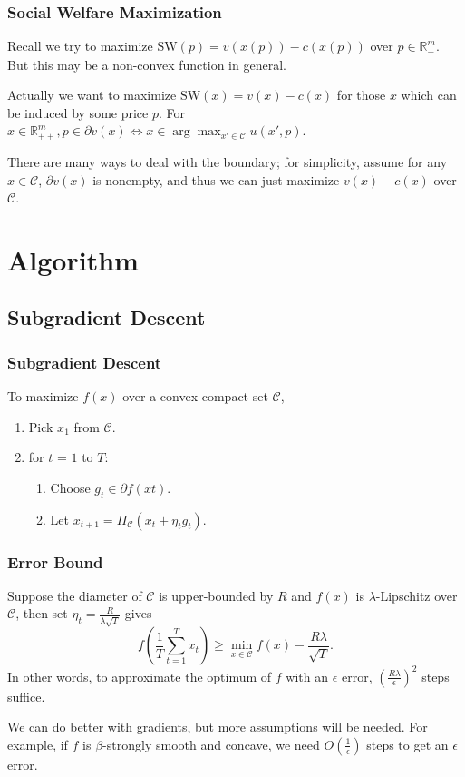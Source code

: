 \documentclass{beamer}
\begin{document}
\begin{frame}
    \frametitle{Social Welfare Maximization}
    Recall we try to maximize $\mathrm{SW}(p)=v(x(p))-c(x(p))$ over $p\in\mathbb{R}_+^m$. But this may be a non-convex function in general.

    Actually we want to maximize $\mathrm{SW}(x)=v(x)-c(x)$ for those $x$ which can be induced by some price $p$. For $x\in \mathbb{R}_{++}^m,p\in\partial v(x)\iff x\in\arg\max_{x'\in \mathcal{C}} u(x',p)$.

    There are many ways to deal with the boundary; for simplicity, assume for any $x\in \mathcal{C}$, $\partial v(x)$ is nonempty, and thus we can just maximize $v(x)-c(x)$ over $\mathcal{C}$.
\end{frame}

\section{Algorithm}
\subsection{Subgradient Descent}

\begin{frame}
    \frametitle{Subgradient Descent}
    To maximize $f(x)$ over a convex compact set $\mathcal{C}$,
    \begin{enumerate}
        \item Pick $x_1$ from $\mathcal{C}$.
        \item for $t$ = $1$ to $T$:
        \begin{enumerate}
            \item Choose $g_t\in\partial f(xt)$.
            \item Let $x_{t+1}=\Pi_{\mathcal{C}}(x_t+\eta_tg_t)$.
        \end{enumerate}
    \end{enumerate}
\end{frame}

\begin{frame}
    \frametitle{Error Bound}
    Suppose the diameter of $\mathcal{C}$ is upper-bounded by $R$ and $f(x)$ is $\lambda$-Lipschitz over $\mathcal{C}$, then set $\eta_t=\frac{R}{\lambda\sqrt{T}}$ gives
    \begin{equation}
        f(\frac{1}{T}\sum_{t=1}^Tx_t)\ge\min_{x\in \mathcal{C}}f(x)-\frac{R\lambda}{\sqrt{T}}.
    \end{equation}
    In other words, to approximate the optimum of $f$ with an $\epsilon$ error, $(\frac{R\lambda}{\epsilon})^2$ steps suffice.

    We can do better with gradients, but more assumptions will be needed. For example, if $f$ is $\beta$-strongly smooth and concave, we need $O(\frac{1}{\epsilon})$ steps to get an $\epsilon$ error.
\end{frame}
\end{document}
